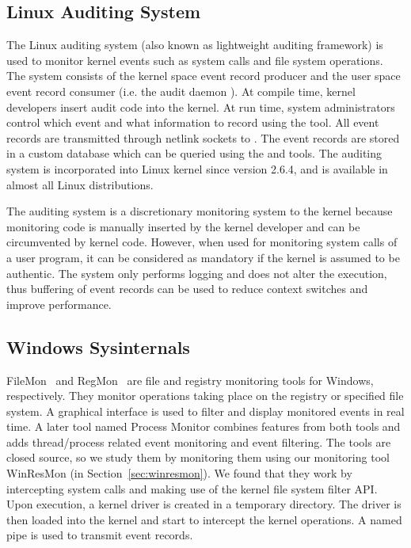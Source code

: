 \subsection{Linux Auditing System}
\label{sec:laudit}

The Linux auditing system (also known as lightweight auditing framework)
is used to monitor kernel events such as system calls and file system
operations.
The system consists of the kernel space event record producer and
the user space event record consumer (i.e. the audit daemon ).
At compile time,
kernel developers insert audit code into the kernel.
At run time, system administrators control which event and what information
to record using the  tool.
All event records are transmitted through netlink sockets to .
The event records are stored in a custom database which can be queried
using the  and  tools.
The auditing system is incorporated into Linux kernel since version 2.6.4,
and is available in almost all Linux distributions.

The auditing system is a discretionary monitoring system to the kernel because
monitoring code is manually inserted by the kernel developer and can
be circumvented by kernel code.
However, when used for monitoring system calls of a user program,
it can be considered as mandatory if the kernel is assumed to be authentic.
The system only performs logging and does not alter the execution,
thus buffering of event records can be used to reduce context switches
and improve performance.

\subsection{Windows Sysinternals}
\label{sec:sysinternals}

FileMon~\cite{filemon} and RegMon~\cite{regmon}
are file and registry monitoring tools for Windows, respectively.
They monitor operations taking place on
the registry or specified file system.
A graphical interface is used to filter and display monitored events in real time.
A later tool named Process Monitor combines features from both tools
and adds thread/process related event monitoring and event filtering.
The tools are closed source, so we study them by monitoring them
using our monitoring tool WinResMon (in Section~\ref{sec:winresmon}).
We found that they work by intercepting system calls and making
use of the kernel file system filter API.
Upon execution, a kernel driver is created in a temporary directory.
The driver is then loaded into the kernel and start to intercept
the kernel operations.
A named pipe is used to transmit event records.

